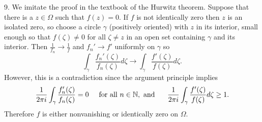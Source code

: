 \documentclass{article}
\newcommand{\N}{\mathbb{N}}
\begin{document}
9. We imitate the proof in the textbook of the Hurwitz theorem. 
Suppose that there is a $z\in \Omega$ such that $f(z) = 0$. If $f$ is not identically zero then $z$ is an isolated zero, so choose a circle $\gamma$ (positively oriented) with $z$ in its interior, small enough so that $f(\zeta) \neq 0$ for all $\zeta \neq z$ in an open set containing $\gamma$ and its interior. Then $\frac{1}{f_n} \to \frac{1}{f}$ and $f_n' \to f'$ uniformly on $\gamma$
so 
$$
\int_{\gamma} \frac{f_n'(\zeta)}{f_n(\zeta)}d\zeta \to \int_{\gamma} \frac{f'(\zeta)}{f(\zeta)}d\zeta.
$$
However, this is a contradiction since the argument principle implies
$$
\frac{1}{2\pi i} \int_{\gamma} \frac{f_n'(\zeta)}{f_n(\zeta)} = 0 \hspace{0.5cm} \text{for all } n\in \N, \text{ and } \hspace{0.5cm} \frac{1}{2\pi i} \int_{\gamma} \frac{f'(\zeta)}{f(\zeta)}d\zeta \geq 1.
$$
Therefore $f$ is either nonvanishing or identically zero on $\Omega$.
\end{document}
